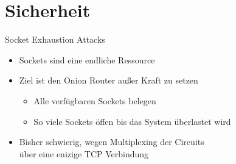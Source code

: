 \documentclass{beamer}
\begin{document}
\section{Sicherheit}


\begin{frame}{Socket Exhaustion Attacks}{\secname}
  \begin{itemize}
    \item Sockets sind eine endliche Ressource
    \item Ziel ist den Onion Router außer Kraft zu setzen
    \begin{itemize}
      \item Alle verfügbaren Sockets belegen
      \item So viele Sockets öffen bis das System überlastet wird
    \end{itemize}
    \item Bisher schwierig, wegen Multiplexing der Circuits\\über eine enizige TCP Verbindung
  \end{itemize}
\end{frame}

\end{document}
